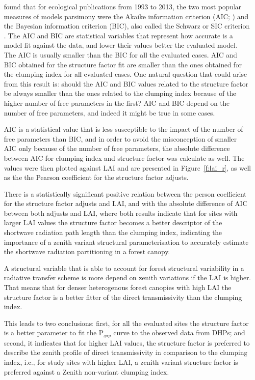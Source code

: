 \documentclass[a4paper,11pt]{report}
\begin{document}
\citet{Aho2014} found that for ecological publications from 1993 to 2013, the two most popular measures of model\textsinglequote s parsimony were the Akaike information criterion (AIC; \citet{Akaike1973}) and the Bayesian information criterion (BIC), also called the Schwarz or SIC criterion \citep{Schwarz1978}. The AIC and BIC are statistical variables that represent how accurate is a model fit against the data, and lower their values better the evaluated model. The AIC is usually smaller than the BIC for all the evaluated cases. AIC and BIC obtained for the structure factor fit are smaller than the ones obtained for the clumping index for all evaluated cases. One natural question that could arise from this result is: should the AIC and BIC values related to the structure factor be always smaller than the ones related to the clumping index because of the higher number of free parameters in the first? AIC and BIC depend on the number of free parameters, and indeed it might be true in some cases.

AIC is a statistical value that is less susceptible to the impact of the number of free parameters than BIC, and in order to avoid the misconception of smaller AIC only because of the number of free parameters, the absolute difference between AIC for clumping index and structure factor was calculate as well. The values were then plotted against LAI and are presented in Figure~\ref{f:lai_r}, as well as the the Pearson coefficient for the structure factor adjusts.

There is a statistically significant positive relation between the person coefficient for the structure factor adjusts and LAI, and with the absolute difference of AIC between both adjusts and LAI, where both results indicate that for sites with larger LAI values the structure factor becomes a better descriptor of the shortwave radiation path length than the clumping index, indicating  the importance of a zenith variant structural parameterisation to accurately estimate the shortwave radiation partitioning in a forest canopy.

A structural variable that is able to account for forest structural variability in a radiative transfer scheme is more depend on zenith variations if the LAI is higher. That means that for denser heterogenous forest canopies with high LAI the structure factor is a better fitter of the direct transmissivity than the clumping index. 
 
This leads to two conclusions: first, for all the evaluated sites the structure factor is a better parameter to fit the P$_{gap}$ curve to the observed data from DHPs; and second, it indicates that for higher LAI values, the structure factor is preferred to describe the zenith profile of direct transmissivity in comparison to the clumping index, i.e., for study sites with higher LAI, a zenith variant structure factor is preferred against a Zenith non-variant clumping index. 
\end{document}
